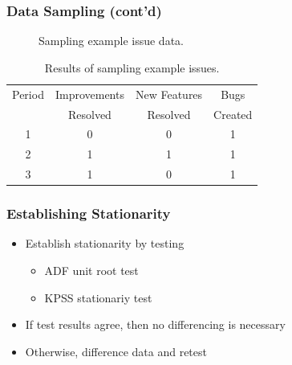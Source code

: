 \documentclass[presentation]{beamer}
\begin{document}
\begin{frame}[t]
\frametitle{Data Sampling (cont'd)}

\tiny{
  \begin{figure}[htbp]
  \begin{center}
  \caption{Sampling example issue data.}
  \end{center}
  \end{figure}

  \vspace{.2cm}
  \begin{table}[htbp]
  \centering
  \begin{tabular}{ c | c | c | c }
  \hline
  Period & Improvements & New Features & Bugs \\
  ~& Resolved & Resolved & Created \\
  \hline
  1 & 0 & 0 & 1 \\
  2 & 1 & 1 & 1 \\
  3 & 1 & 0 & 1 \\
  \hline
  \end{tabular}
  \caption{Results of sampling example issues.}
  \end{table}
}
\end{frame}

\begin{frame}[t]
\frametitle{Establishing Stationarity}
\begin{itemize}
\item{Establish stationarity by testing
  \begin{itemize}
  \item{ADF unit root test}
  \item{KPSS stationariy test}
  \end{itemize}}
\item{If test results agree, then no differencing is necessary}
\item{Otherwise, difference data and retest}
\end{itemize}
\end{frame}
\end{document}
